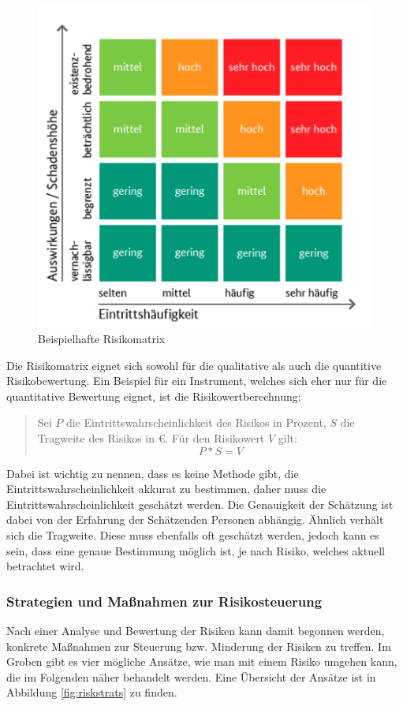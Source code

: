 \documentclass[ThesisDJ.tex]{subfiles}
\begin{document}
\begin{figure}
    \centering
    \includegraphics[width=0.6\linewidth]{risikomatrix.png}
    \caption{Beispielhafte Risikomatrix}
    \label{fig:riskmatrix}
\end{figure}

Die Risikomatrix eignet sich sowohl für die qualitative als auch die quantitive Risikobewertung. Ein Beispiel für ein Instrument, welches sich eher nur für die quantitative Bewertung eignet, ist die Risikowertberechnung:

\begin{quote}
    Sei $P$ die Eintrittswahrscheinlichkeit des Risikos in Prozent, $S$ die Tragweite des Risikos in €. Für den Risikowert $V$ gilt:
    \[ P * S = V \]  
\end{quote}

Dabei ist wichtig zu nennen, dass es keine Methode gibt, die Eintrittswahrscheinlichkeit akkurat zu bestimmen, daher muss die Eintrittswahrscheinlichkeit geschätzt werden. Die Genauigkeit der Schätzung ist dabei von der Erfahrung der Schätzenden Personen abhängig. Ähnlich verhält sich die Tragweite. Diese muss ebenfalls oft geschätzt werden, jedoch kann es sein, dass eine genaue Bestimmung möglich ist, je nach Risiko, welches aktuell betrachtet wird.

\subsubsection{Strategien und Maßnahmen zur Risikosteuerung}
Nach einer Analyse und Bewertung der Risiken kann damit begonnen werden, konkrete Maßnahmen zur Steuerung bzw. Minderung der Risiken zu treffen. Im Groben gibt es vier mögliche Ansätze, wie man mit einem Risiko umgehen kann, die im Folgenden näher behandelt werden. Eine Übersicht der Ansätze ist in Abbildung \ref{fig:riskstrats}\cite[S.~25]{cicek2022risikomanagement} zu finden.
\end{document}
